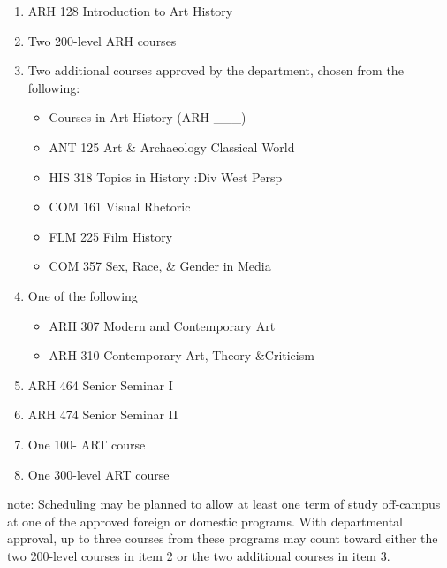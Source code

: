 \documentclass[
  letterpaper,
]{scrbook}
\providecommand{\tightlist}{%
  \setlength{\itemsep}{0pt}\setlength{\parskip}{0pt}}
\begin{document}
\begin{enumerate}
\def\labelenumi{\arabic{enumi}.}
\tightlist
\item
  ARH 128 Introduction to Art History\\
\item
  Two 200-level ARH courses\\
\item
  Two additional courses approved by the department, chosen from the
  following:

  \begin{itemize}
  \tightlist
  \item
    Courses in Art History (ARH-\_\_\_)\\
  \item
    ANT 125 Art \& Archaeology Classical World\\
  \item
    HIS 318 Topics in History :Div West Persp\\
  \item
    COM 161 Visual Rhetoric\\
  \item
    FLM 225 Film History\\
  \item
    COM 357 Sex, Race, \& Gender in Media\\
  \end{itemize}
\item
  One of the following

  \begin{itemize}
  \tightlist
  \item
    ARH 307 Modern and Contemporary Art\\
  \item
    ARH 310 Contemporary Art, Theory \&Criticism\\
  \end{itemize}
\item
  ARH 464 Senior Seminar I\\
\item
  ARH 474 Senior Seminar II\\
\item
  One 100- ART course\\
\item
  One 300-level ART course
\end{enumerate}

note: Scheduling may be planned to allow at least one term of study
off-campus at one of the approved foreign or domestic programs. With
departmental approval, up to three courses from these programs may count
toward either the two 200-level courses in item 2 or the two additional
courses in item 3.
\end{document}
